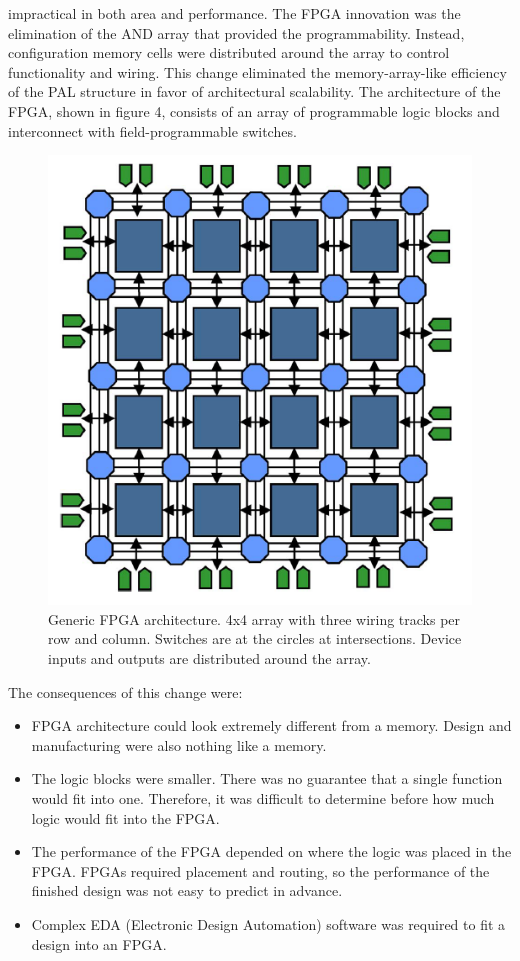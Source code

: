 impractical in both area and performance.
\newline
The FPGA innovation was the elimination of the AND array that provided the programmability. Instead, configuration
memory cells were distributed around the array to control functionality and wiring. This change eliminated the
memory-array-like efficiency of the PAL structure in favor of architectural scalability. The architecture of the FPGA,
shown in figure 4, consists of an array of programmable logic blocks and interconnect with field-programmable switches.
\begin{figure}[H]
	\centering
	\includegraphics[width=0.7\linewidth]{IMG/ch3/FPGA}
	\caption{Generic FPGA architecture. 4x4 array with three wiring
		tracks per row and column. Switches are at the circles at intersections.
		Device inputs and outputs are distributed around the array.}
	\label{fig:fpga}
\end{figure}
\noindent The consequences of this change were:
\begin{itemize}
	\item FPGA architecture could look extremely different from a memory. Design and manufacturing were also nothing like a memory.
	\item The logic blocks were smaller. There was no guarantee that a single function would fit into one. Therefore, it was difficult to determine before how much logic would fit into the FPGA.
	\item The performance of the FPGA depended on where the logic was placed in the FPGA. FPGAs required placement and routing, so the performance of the finished design was not easy to predict in advance.
	\item Complex EDA (Electronic Design Automation) software was required to fit a design into an FPGA.
\end{itemize}



